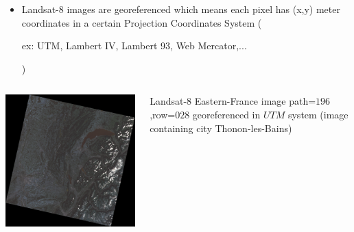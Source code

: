 \documentclass[c]{beamer}
\begin{document}
\begin{frame}
\begin{itemize}
 \item Landsat-8 images are georeferenced which means each pixel has (x,y) meter coordinates in a certain Projection Coordinates 
System (\begin{itshape}ex: UTM, Lambert IV, Lambert 93, Web Mercator,...\end{itshape})
\end{itemize}

\begin{columns}
\begin{column}{0.30\textwidth}
\begin{overlayarea}{\linewidth}{5cm}
  \centering\vfill
  \includegraphics[scale=0.2]{images/georeferencing/Thonon_landsat.png}
\end{overlayarea}
\end{column}
\begin{column}{0.30\textwidth}
\begin{overlayarea}{\linewidth}{1cm}
  \centering
  \tiny Landsat-8 Eastern-France image path=$196$,row=$028$ georeferenced in $UTM$ system (image containing city Thonon-les-Bains)\par
\end{overlayarea}
\end{column}


\end{columns}
\end{frame}
\end{document}
